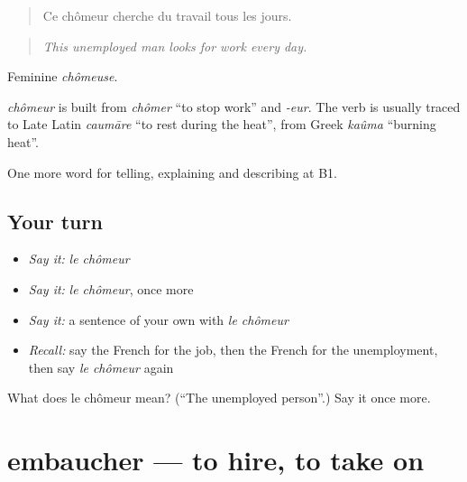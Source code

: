 \begin{quote}
Ce chômeur cherche du travail tous les jours.
\end{quote}

\begin{quote}
\emph{This unemployed man looks for work every day.}
\end{quote}

Feminine \emph{chômeuse}.

\begin{cousinweb}
\emph{chômeur} is built from \emph{chômer} \textquotedblleft{}to stop work\textquotedblright{} and \emph{-eur}. The verb is usually traced to Late Latin \emph{caumāre} \textquotedblleft{}to rest during the heat\textquotedblright{}, from Greek \emph{kaûma} \textquotedblleft{}burning heat\textquotedblright{}.
\end{cousinweb}

\begin{grammarlens}[title={What you've built}]
One more word for telling, explaining and describing at B1.
\end{grammarlens}

\subsection*{Your turn}
\begin{itemize}
\raggedright
  \item \emph{Say it:} \emph{le chômeur}
  \item \emph{Say it:} \emph{le chômeur}, once more
  \item \emph{Say it:} a sentence of your own with \emph{le chômeur}
  \item \emph{Recall:} say the French for the job, then the French for the unemployment, then say \emph{le chômeur} again
\end{itemize}

\begin{tcolorbox}[breakable,colback=teal!4,colframe=teal!35!black,title={Before you move on}]
What does le chômeur mean? (\textquotedblleft{}The unemployed person\textquotedblright{}.) Say it once more.
\end{tcolorbox}
\section[embaucher]{embaucher — to hire, to take on}

\label{lesson:FR-C356-embaucher}



